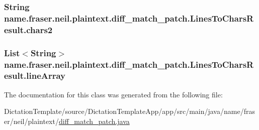 \subsubsection[{\texorpdfstring{chars2}{chars2}}]{\setlength{\rightskip}{0pt plus 5cm}String name.\+fraser.\+neil.\+plaintext.\+diff\+\_\+match\+\_\+patch.\+Lines\+To\+Chars\+Result.\+chars2\hspace{0.3cm}{\ttfamily [protected]}}\hypertarget{classname_1_1fraser_1_1neil_1_1plaintext_1_1diff__match__patch_1_1LinesToCharsResult_a6dec911e50bdb1eeefb8d0e586b7d91f}{}\label{classname_1_1fraser_1_1neil_1_1plaintext_1_1diff__match__patch_1_1LinesToCharsResult_a6dec911e50bdb1eeefb8d0e586b7d91f}
\subsubsection[{\texorpdfstring{line\+Array}{lineArray}}]{\setlength{\rightskip}{0pt plus 5cm}List$<$String$>$ name.\+fraser.\+neil.\+plaintext.\+diff\+\_\+match\+\_\+patch.\+Lines\+To\+Chars\+Result.\+line\+Array\hspace{0.3cm}{\ttfamily [protected]}}\hypertarget{classname_1_1fraser_1_1neil_1_1plaintext_1_1diff__match__patch_1_1LinesToCharsResult_a3cf66c74c672cf71959901cacd01fdd4}{}\label{classname_1_1fraser_1_1neil_1_1plaintext_1_1diff__match__patch_1_1LinesToCharsResult_a3cf66c74c672cf71959901cacd01fdd4}


The documentation for this class was generated from the following file\+:\begin{DoxyCompactItemize}
\item 
Dictation\+Template/source/\+Dictation\+Template\+App/app/src/main/java/name/fraser/neil/plaintext/\hyperlink{diff__match__patch_8java}{diff\+\_\+match\+\_\+patch.\+java}\end{DoxyCompactItemize}

